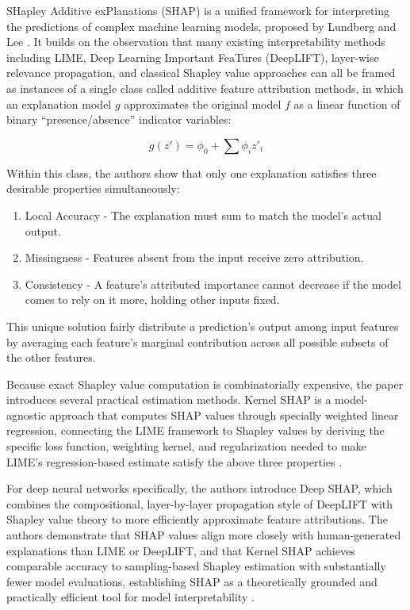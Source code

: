 SHapley Additive exPlanations (SHAP) is a unified framework for interpreting the predictions of complex machine learning models,
proposed by Lundberg and Lee \cite{lundberg2017unified}. It builds on the observation that many existing interpretability
methods including LIME, Deep Learning Important FeaTures (DeepLIFT), layer-wise relevance propagation, and classical Shapley value
approaches can all be framed as instances of a single class called additive feature attribution methods, in which an explanation
model $g$ approximates the original model $f$ as a linear function of binary ``presence/absence'' indicator variables:

\begin{equation}[SHAP Additive Feature Attribution]
g(z') = \phi_0 + \sum \phi_i z'_i
\end{equation}

Within this class, the authors show that only one explanation satisfies three desirable properties simultaneously:
\begin{enumerate}
    \item Local Accuracy - The explanation must sum to match the model's actual output.
    \item Missingness - Features absent from the input receive zero attribution.
    \item Consistency - A feature's attributed importance cannot decrease if the model comes to rely on it more, holding other inputs fixed.
\end{enumerate}

This unique solution fairly distribute a prediction's output among input features by averaging each feature's marginal
contribution across all possible subsets of the other features.

Because exact Shapley value computation is combinatorially expensive, the paper introduces several practical estimation methods.
Kernel SHAP is a model-agnostic approach that computes SHAP values through specially weighted linear regression, connecting the LIME
framework to Shapley values by deriving the specific loss function, weighting kernel, and regularization needed to make LIME's
regression-based estimate satisfy the above three properties \cite{lundberg2017unified}.

For deep neural networks specifically, the authors introduce Deep SHAP, which combines the compositional, layer-by-layer
propagation style of DeepLIFT with Shapley value theory to more efficiently approximate feature attributions.
The authors demonstrate that SHAP values align more closely with human-generated explanations than LIME or DeepLIFT, and that Kernel SHAP
achieves comparable accuracy to sampling-based Shapley estimation with substantially fewer model evaluations, establishing SHAP
as a theoretically grounded and practically efficient tool for model interpretability \cite{lundberg2017unified}.

